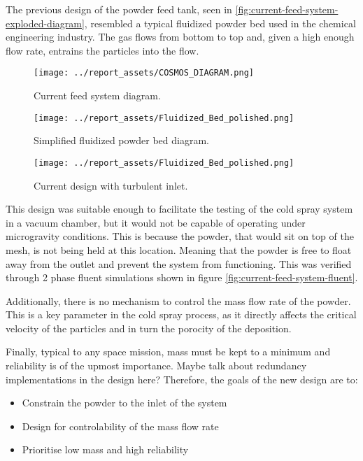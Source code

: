 The previous design of the powder feed tank, seen in \autoref{fig:current-feed-system-exploded-diagram}, resembled a typical fluidized powder bed used in the chemical engineering industry. The gas flows from bottom to top and, given a high enough flow rate, entrains the particles into the flow.
\begin{figure}[htbp]
    \centering

    \begin{minipage}{0.3\textwidth}
        \centering
        \texttt{[image: ../report\_assets/COSMOS\_DIAGRAM.png]}
        \caption{Current feed system diagram.}\label{fig:current-feed-system-exploded-diagram}
    \end{minipage}
    \hfill
    \begin{minipage}{0.3\textwidth}
        \centering
        \texttt{[image: ../report\_assets/Fluidized\_Bed\_polished.png]}
        \caption{Simplified fluidized powder bed diagram.}\label{fig:fluidized-bed-diagram}
    \end{minipage}
    \hfill
    \begin{minipage}{0.3\textwidth}
        \centering
        \texttt{[image: ../report\_assets/Fluidized\_Bed\_polished.png]}
        \caption{Current design with turbulent inlet.}\label{fig:current-feed-system-fluent}
    \end{minipage}

\end{figure}

This design was suitable enough to facilitate the testing of the cold spray system in a vacuum chamber, but it would not be capable of operating under microgravity conditions. This is because the powder, that would sit on top of the mesh, is not being held at this location. Meaning that the powder is free to float away from the outlet and prevent the system from functioning. This was verified through 2 phase fluent simulations shown in figure \autoref{fig:current-feed-system-fluent}. 

Additionally, there is no mechanism to control the mass flow rate of the powder. This is a key parameter in the cold spray process, as it directly affects the critical velocity of the particles and in turn the porocity of the deposition. 


Finally, typical to any space mission, mass must be kept to a minimum and reliability is of the upmost importance. Maybe talk about redundancy implementations in the design here?
Therefore, the goals of the new design are to:
\begin{itemize}
    \item Constrain the powder to the inlet of the system
    \item Design for controlability of the mass flow rate
    \item Prioritise low mass and high reliability
\end{itemize}
